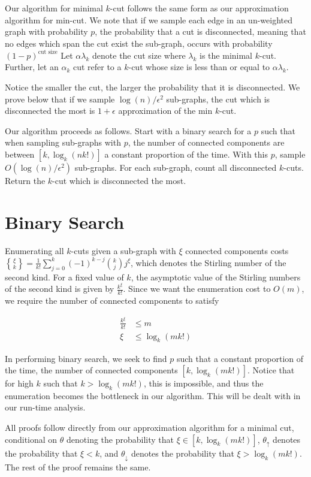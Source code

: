\documentclass{acm_proc_article-sp}
\DeclareRobustCommand{\stirling}{\genfrac\{\}{0pt}{}}
\begin{document}
Our algorithm for minimal $k$-cut follows the same form as our approximation algorithm for min-cut. We note that if we sample each edge in an un-weighted graph with probability $p$, the probability that a cut is disconnected, meaning that no edges which span the cut exist the sub-graph, occurs with probability $(1-p)^{\text{cut size}}$ Let $\alpha \lambda_k$ denote the cut size where $\lambda_k$ is the minimal $k$-cut. Further, let an $\alpha_k$ cut refer to a $k$-cut whose size is less than or equal to $\alpha \lambda_k$. 

Notice the smaller the cut, the larger the probability that it is disconnected. We prove below that if we sample $\log(n)/\epsilon^2$ sub-graphs,  the cut which is disconnected the most is $1+\epsilon$ approximation of the min $k$-cut.

Our algorithm proceeds as follows. Start with a binary search for a $p$ such that when sampling sub-graphs with $p$, the number of connected components are between $[k, \log_k(n k!)]$ a constant proportion of the time. With this $p$, sample $O(\log(n)/\epsilon^2)$ sub-graphs. For each sub-graph, count all disconnected $k$-cuts. Return the $k$-cut which is disconnected the most.

\section{Binary Search} Enumerating all $k$-cuts given a sub-graph with $\xi$ connected components costs $ \stirling{\xi}{k} = \frac{1}{k!} \sum_{j=0}^k (-1)^{k-j} \binom{k}{j} j^\xi$, which denotes the Stirling number of the second kind. For a fixed value of $k$, the asymptotic value of the Stirling numbers of the second kind is given by $\frac{k^\xi}{k!}$. Since we want the enumeration cost to $O(m)$, we require the number of connected components to satisfy

\begin{align*}
\frac{k^\xi}{k!} &\leq m \\
\xi &\leq \log_k(m k!) 
\end{align*}

In performing binary search, we seek to find $p$ such that a constant proportion of the time, the number of connected components 
$[k, \log_k(m k!)]$. Notice that for high $k$ such that 
$k > \log_k(mk!)$, this is impossible, and thus the enumeration becomes the bottleneck in our algorithm. This will be dealt with in our run-time analysis.

All proofs follow directly from our approximation algorithm for a minimal cut, conditional on $\theta$ denoting the probability that $\xi \in [k, \log_k(mk!)]$, $\theta_{\uparrow}$ denotes the probability that $\xi < k$, and $\theta_{\downarrow}$ denotes the probability that $\xi > \log_k(mk!)$. The rest of the proof remains the same.
\end{document}
